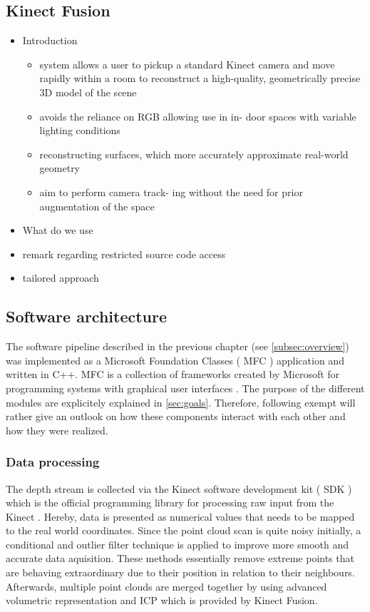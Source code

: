 \subsection{Kinect Fusion}
\begin{itemize}
\item Introduction
\begin{itemize}
\item system allows a user to pickup a standard Kinect camera and move rapidly within a room to reconstruct a high-quality, geometrically precise 3D model of the scene
\item avoids the reliance on RGB allowing use in in- door spaces with variable lighting conditions
\item reconstructing surfaces, which more accurately approximate real-world geometry
\item aim to perform camera track- ing without the need for prior augmentation of the space
\end{itemize}
\item What do we use
\item remark regarding restricted source code access
\item tailored approach
\end{itemize}
\subsection{Software architecture}
The software pipeline described in the previous chapter (see \autoref{subsec:overview}) was implemented as a Microsoft Foundation Classes ( MFC ) application and written in C++. MFC is a collection of frameworks created by Microsoft for programming systems with graphical user interfaces \cite{Fayad:1997:OAF:262793.262798}. The purpose of the different modules are explicitely explained in \autoref{sec:goals}. Therefore, following exempt will rather give an outlook on how these components interact with each other and how they were realized.
\subsubsection{Data processing}
The depth stream is collected via the Kinect software development kit ( SDK ) which is the official programming library for processing raw input from the Kinect \cite{Abhijit:2012:KWS:2490784}. Hereby, data is presented as numerical values that needs to be mapped to the real world coordinates. Since the point cloud scan is quite noisy initially, a conditional and outlier filter technique is applied to improve more smooth and accurate data aquisition. These methods essentially remove extreme points that are behaving extraordinary due to their position in relation to their neighbours.\\
Afterwards, multiple point clouds are merged together by using advanced volumetric representation \cite{Curless:1996:VMB:237170.237269} and ICP which is provided by Kinect Fusion.
